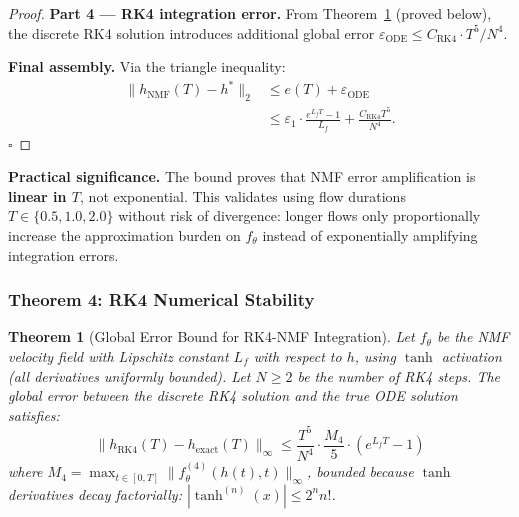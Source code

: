 \documentclass{scpe}
\newtheorem{theorem}{Theorem}[section]
\begin{document}
\begin{proof}
\textbf{Part 4 --- RK4 integration error.}
From Theorem~\ref{thm:nmf-rk4} (proved below), the discrete RK4 solution introduces additional global error $\varepsilon_{\text{ODE}} \leq C_{\text{RK4}} \cdot T^5 / N^4$.

\textbf{Final assembly.}
Via the triangle inequality:
\begin{align}
\|h_{\text{NMF}}(T) - h^*\|_2 &\leq e(T) + \varepsilon_{\text{ODE}} \\
&\leq \varepsilon_1 \cdot \frac{e^{L_f T} - 1}{L_f} + \frac{C_{\text{RK4}} T^5}{N^4}.
\end{align}
$\square$
\end{proof}

\textbf{Practical significance.} The bound proves that NMF error amplification is \textbf{linear in $T$}, not exponential. This validates using flow durations $T \in \{0.5, 1.0, 2.0\}$ without risk of divergence: longer flows only proportionally increase the approximation burden on $f_\theta$ instead of exponentially amplifying integration errors.

\subsubsection{Theorem 4: RK4 Numerical Stability}

\begin{theorem}[Global Error Bound for RK4-NMF Integration]
\label{thm:nmf-rk4}
Let $f_\theta$ be the NMF velocity field with Lipschitz constant $L_f$ with respect to $h$, using $\tanh$ activation (all derivatives uniformly bounded). Let $N \geq 2$ be the number of RK4 steps. The global error between the discrete RK4 solution and the true ODE solution satisfies:
\begin{equation}
\|h_{\text{RK4}}(T) - h_{\text{exact}}(T)\|_\infty \leq \frac{T^5}{N^4} \cdot \frac{M_4}{5} \cdot (e^{L_f T} - 1)
\end{equation}
where $M_4 = \max_{t \in [0,T]} \|f_\theta^{(4)}(h(t), t)\|_\infty$, bounded because $\tanh$ derivatives decay factorially: $|\tanh^{(n)}(x)| \leq 2^n n!$.
\end{theorem}
\end{document}
